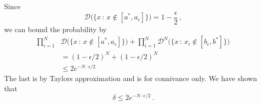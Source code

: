 \documentclass[10pt, table, handout]{beamer}
\begin{document}
\begin{frame}[fragile]{}

Since 
$$
\mathcal{D}\bigg(\big\{x\,:\,x\not\in [a^*,a_\epsilon]\big\}\bigg) = 1 - \frac{\epsilon}2\,,
$$\pause
we can bound the probability by
\begin{align*}
\prod_{i=1}^N&\mathcal{D}\bigg(\big\{x\,:\,x\not\in [a^*,a_\epsilon]\big\}\bigg) + \prod_{i=1}^N \mathcal{D}^N\bigg(\big\{x\,:\,x_i\not\in [b_\epsilon, b^*]\big\}\bigg)
\\
&=
(1-\epsilon/2)^N + (1-\epsilon/2)^N 
\\
&\leq 2e^{-N\cdot\epsilon/2}
\end{align*}
\pause
The last is by Taylors approximation and is for connivance only. We have shown that 
$$
\delta\leq 2e^{-N\cdot\epsilon/2}\,.
$$
\end{frame}
\end{document}
